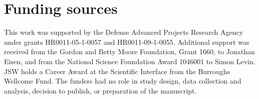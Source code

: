 
\section{Funding sources}
This work was supported by the Defense Advanced Projects Research Agency under grants HR0011-05-1-0057 and HR0011-09-1-0055. Additional support was received from the Gordon and Betty Moore Foundation, Grant 1660, to Jonathan Eisen, and from the National Science Foundation Award 1046001 to Simon Levin. JSW holds a Career Award at the Scientific Interface from the Burroughs Wellcome Fund.  The funders had no role in study design, data collection and analysis, decision to publish, or preparation of the manuscript. 

